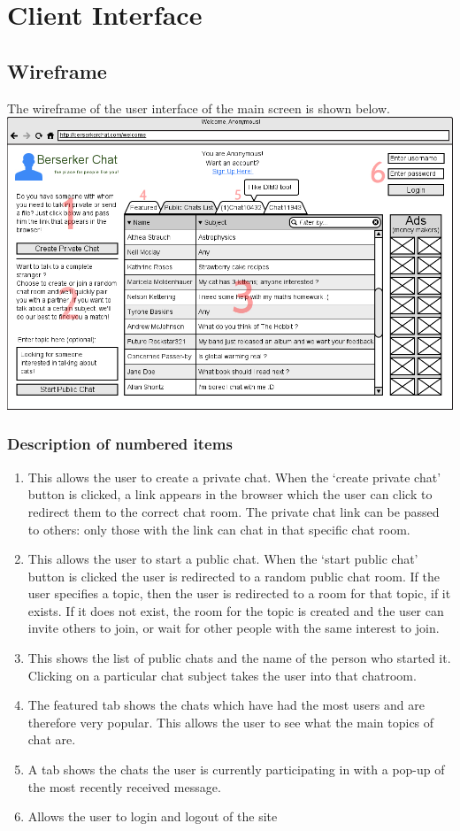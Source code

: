 \documentclass{sig-alt-release2}
\begin{document}
\section{Client Interface}

\subsection{Wireframe}
The wireframe of the user interface of the main screen is shown below.\\

\includegraphics[scale=0.25]{wireframe_num.jpg}
\\
\subsubsection{Description of numbered items}
\begin{enumerate}
\item This allows the user to create a private chat. When the `create private chat' button is clicked, a link appears in the browser which the user can click to redirect them to the correct chat room. The private chat link can be passed to others: only those with the link can chat in that specific chat room. 
\item This allows the user to start a public chat. When the `start public chat' button is clicked the user is redirected to a random public chat room. If the user specifies a topic, then the user is redirected to a room for that topic, if it exists. If it does not exist, the room for the topic is created and the user can invite others to join, or wait for other people with the same interest to join.
\item This shows the list of public chats and the name of the person who started it. Clicking on a particular chat subject takes the user into that chatroom. 
\item The featured tab shows the chats which have had the most users and are therefore very popular. This allows the user to see what the main topics of chat are.
\item A tab shows the chats the user is currently participating in with a pop-up of the most recently received message.
\item Allows the user to login and logout of the site
\end{enumerate}
\end{document}
